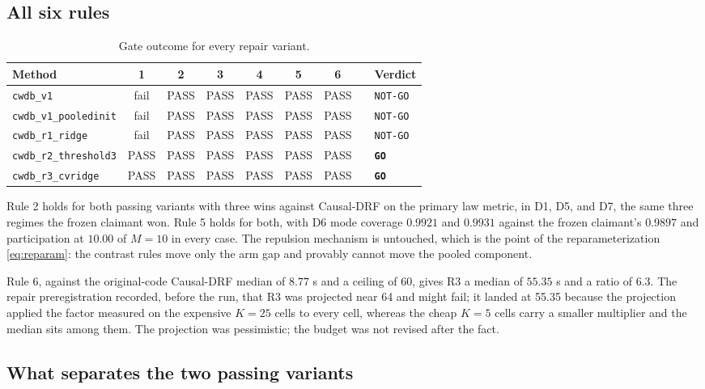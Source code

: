 \documentclass[11pt,a4paper]{article}
\theoremstyle{definition}
\theoremstyle{remark}
\begin{document}
\subsection{All six rules}

\begin{table}[htbp]
\centering
\caption{Gate outcome for every repair variant.}
\label{tab:gate2}
\small
\begin{tabular}{@{}lcccccccl@{}}
\toprule
Method & 1 & 2 & 3 & 4 & 5 & 6 & & Verdict \\
\midrule
\texttt{cwdb\_v1} & fail & PASS & PASS & PASS & PASS & PASS & & \texttt{NOT-GO} \\
\texttt{cwdb\_v1\_pooledinit} & fail & PASS & PASS & PASS & PASS & PASS & & \texttt{NOT-GO} \\
\texttt{cwdb\_r1\_ridge} & fail & PASS & PASS & PASS & PASS & PASS & & \texttt{NOT-GO} \\
\texttt{cwdb\_r2\_threshold3} & PASS & PASS & PASS & PASS & PASS & PASS & & \textbf{\texttt{GO}} \\
\texttt{cwdb\_r3\_cvridge} & PASS & PASS & PASS & PASS & PASS & PASS & & \textbf{\texttt{GO}} \\
\bottomrule
\end{tabular}
\end{table}

Rule 2 holds for both passing variants with three wins against Causal-DRF on the
primary law metric, in D1, D5, and D7, the same three regimes the frozen claimant
won. Rule 5 holds for both, with D6 mode coverage $0.9921$ and $0.9931$ against
the frozen claimant's $0.9897$ and participation at $10.00$ of $M = 10$ in every
case. The repulsion mechanism is untouched, which is the point of the
reparameterization \eqref{eq:reparam}: the contrast rules move only the arm gap
and provably cannot move the pooled component.

Rule 6, against the original-code Causal-DRF median of $8.77$ s and a ceiling of
60, gives R3 a median of $55.35$ s and a ratio of $6.3$.
The repair preregistration recorded, before the run, that R3 was projected near
64 and might fail; it landed at 55.35 because the projection applied the factor
measured on the expensive $K=25$ cells to every cell, whereas the cheap $K=5$
cells carry a smaller multiplier and the median sits among them. The projection
was pessimistic; the budget was not revised after the fact.

\subsection{What separates the two passing variants}
\end{document}
